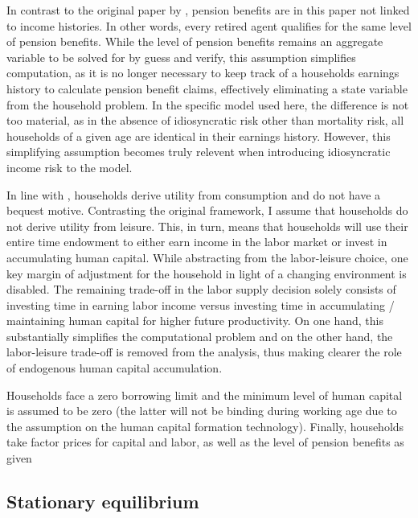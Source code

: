 In contrast to the original paper by \cite{LudwigSchelkleVogel2012}, pension benefits are in this paper not linked to income histories. In other words, every retired agent qualifies for the same level of pension benefits. While the level of pension benefits remains an aggregate variable to be solved for by guess and verify, this assumption simplifies computation, as it is no longer necessary to keep track of a households earnings history to calculate pension benefit claims, effectively eliminating a state variable from the household problem. In the specific model used here, the difference is not too material, as in the absence of idiosyncratic risk other than mortality risk, all households of a given age are identical in their earnings history. However, this simplifying assumption becomes truly relevent when introducing idiosyncratic income risk to the model.

In line with \citet{LudwigSchelkleVogel2012}, households derive utility from consumption and do not have a bequest motive. Contrasting the original framework, I assume that households do not derive utility from leisure. This, in turn, means that households will use their entire time endowment to either earn income in the labor market or invest in accumulating human capital. While abstracting from the labor-leisure choice, one key margin of adjustment for the household in light of a changing environment is disabled. The remaining trade-off in the labor supply decision solely consists of investing time in earning labor income versus investing time in accumulating / maintaining human capital for higher future productivity. On one hand, this substantially simplifies the computational problem and on the other hand, the labor-leisure trade-off is removed from the analysis, thus making clearer the role of endogenous human capital accumulation.

Households face a zero borrowing limit and the minimum level of human capital is assumed to be zero (the latter will not be binding during working age due to the assumption on the human capital formation technology). Finally, households take factor prices for capital and labor, as well as the level of pension benefits as given

\subsection{Stationary equilibrium}

